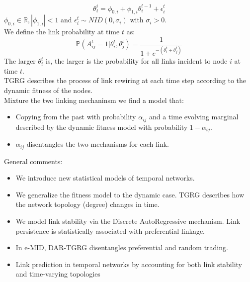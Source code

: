 \[
\theta_t^i = \phi_{0,i} + \phi_{1,i}\theta_i^{t-1} + \epsilon^t_i
\]
$\phi_{0,i} \in \mathbb{R},|\phi_{1,i}|<1$ and $\epsilon_i^t\sim NID(0,\sigma_i)$ with $\sigma_i > 0$.\\
We define the link probability at time $t$ as:
\[
\mathbb{P}(A^t_{ij} =1 |\theta_i^t, \theta_j^t) = \frac{1}{1 + e^{- (\theta_i^t + \theta_j^t)}}
\]
The larger $\theta_i^t$ is, the larger is the probability for all links incident to node $i$ at time $t$.\\
TGRG describes the process of link rewiring at each time step according to the dynamic fitness of the nodes.\\
Mixture the two linking mechaninsm we find a model that:
\begin{itemize}
	\item Copying from the past with probability $\alpha_{ij}$ and a time evolving marginal described by the dynamic fitness model with probability $1-\alpha_{ij}$.
	\item $\alpha_{ij}$ disentangles the two mechanisms for each link.
\end{itemize}
General comments:
\begin{itemize}
	\item We introduce new statistical models of temporal networks. 
	\item We generalize the fitness model to the dynamic case. TGRG describes how the network topology (degree) changes in time.
	\item We model link stability via the Discrete AutoRegressive mechanism. Link persistence is statistically associated with preferential linkage.
	\item In e-MID, DAR-TGRG disentangles preferential and random trading.
	\item Link prediction in temporal networks by accounting for both link stability and
	time-varying topologies
\end{itemize}
